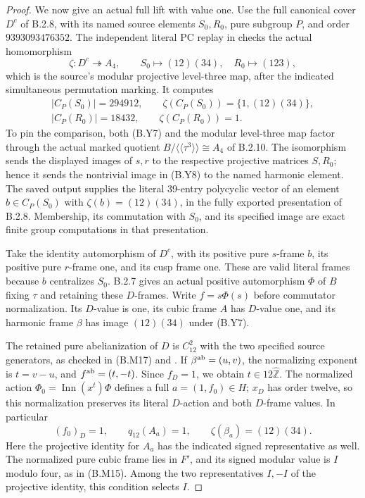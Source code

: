 \begin{proof}
We now give an actual full lift with value one.
Use the full canonical cover $D^c$ of B.2.8, with its
named source elements $S_0,R_0$, pure subgroup $P$,
and order $9393093476352$.  The independent literal
PC replay in 
checks the actual homomorphism
\[
 \zeta:D^c\twoheadrightarrow A_4,
 \qquad S_0\mapsto(12)(34),\quad R_0\mapsto(123),
 \tag{B.Y7}
\]
which is the source's modular projective level-three
map, after the indicated simultaneous permutation
marking.  It computes
\[
 \begin{gathered}
 |C_P(S_0)|=294912,\qquad
          \zeta(C_P(S_0))=\{1,(12)(34)\},\\
 |C_P(R_0)|=18432,\qquad \zeta(C_P(R_0))=1.
 \end{gathered}                                      \tag{B.Y8}
\]
To pin the comparison, both (B.Y7) and the modular
level-three map factor through the actual marked
quotient $B/\langle\!\langle\tau^3\rangle\!\rangle
\cong A_4$ of B.2.10.  The isomorphism sends the
displayed images of $s,r$ to the respective projective
matrices $S,R_0$; hence it sends the nontrivial image
in (B.Y8) to the named harmonic element.
The saved output supplies the literal 39-entry
polycyclic vector of an element $b\in C_P(S_0)$
with $\zeta(b)=(12)(34)$, in the fully exported
presentation of B.2.8.  Membership, its commutation
with $S_0$, and its specified image are exact finite
group computations in that presentation.

Take the identity automorphism of $D^c$, with its
positive pure $s$-frame $b$, its positive pure $r$-frame
one, and its cusp frame one.  These are valid literal
frames because $b$ centralizes $S_0$.  B.2.7 gives an
actual positive automorphism $\Phi$ of $B$ fixing
$\tau$ and retaining these $D$-frames.  Write
$f=s\Phi(s)$ before commutator normalization.  Its
$D$-value is one, its cubic frame $A$ has $D$-value
one, and its harmonic frame $\beta$ has image
$(12)(34)$ under (B.Y7).

The retained pure abelianization of $D$ is $C_{12}^2$
with the two specified source generators, as checked
in (B.M17) and .
If $\beta^{\rm ab}=(u,v)$, the normalizing exponent
is $t=v-u$, and $f^{\rm ab}=(t,-t)$.
Since $f_D=1$, we obtain $t\in12\widehat{\mathbb Z}$.
The normalized action
$\Phi_0=\operatorname{Inn}(x^t)\Phi$ defines a full
$a=(1,f_0)\in H$; $x_D$ has order twelve, so this
normalization preserves its literal $D$-action and
both $D$-frame values.  In particular
\[
 (f_0)_D=1,\qquad q_{12}(A_a)=1,\qquad
        \zeta(\beta_a)=(12)(34).
 \tag{B.Y9}
\]
Here the projective identity for $A_a$ has the indicated
signed representative as well.  The normalized pure
cubic frame lies in $F'$, and its signed modular value
is $I$ modulo four, as in (B.M15).  Among the two
representatives $I,-I$ of the projective identity, this
condition selects $I$.


\end{proof}
